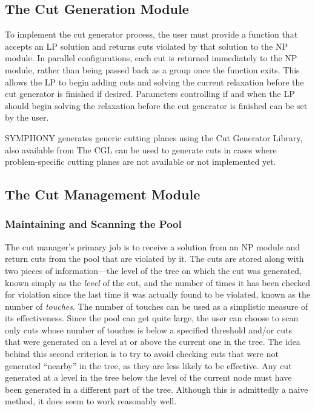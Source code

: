 \subsection{The Cut Generation Module}

To implement the cut generator process, the user must provide a
function that accepts an LP solution and returns cuts violated by that
solution to the NP module. In parallel configurations, each cut is
returned immediately to the NP module, rather than being passed back
as a group once the function exits. This allows the LP to begin adding
cuts and solving the current relaxation before the cut generator is
finished if desired. Parameters controlling if and when the LP should
begin solving the relaxation before the cut generator is finished can
be set by the user.

SYMPHONY generates generic cutting planes using the Cut Generator Library,
also available from 
The CGL can be used to generate cuts in cases where problem-specific cutting
planes are not available or not implemented yet. 

\subsection{The Cut Management Module}

\subsubsection{Maintaining and Scanning the Pool}

The cut manager's primary job is to receive a solution from an
NP module and return cuts from the pool that are violated by it. The
cuts are stored along with two pieces of information---the level of
the tree on which the cut was generated, known simply as the {\em
level} of the cut, and the number of times it has been checked for
violation since the last time it was actually found to be violated,
known as the number of {\em touches}. The number of touches
can be used as a simplistic measure of its effectiveness. Since the pool
can get quite large, the user can choose to scan only cuts whose
number of touches is below a specified threshold and/or cuts that were
generated on a level at or above the current one in the tree. The idea
behind this second criterion is to try to avoid checking cuts that were
not generated ``nearby'' in the tree, as they are less likely to be
effective. Any cut generated at a level in the tree
below the level of the current node must have been generated in a
different part of the tree. Although this is admittedly a naive
method, it does seem to work reasonably well.

